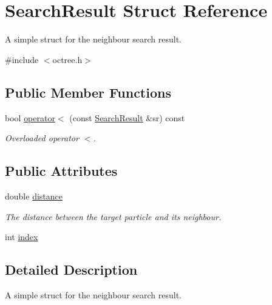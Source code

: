 \hypertarget{structSearchResult}{\section{Search\-Result Struct Reference}
\label{structSearchResult}
}


A simple struct for the neighbour search result.  




{\ttfamily \#include $<$octree.\-h$>$}

\subsection*{Public Member Functions}
\begin{DoxyCompactItemize}
\item 
\hypertarget{structSearchResult_a1ec14c4b56c210f654c4043b89d18121}{bool \hyperlink{structSearchResult_a1ec14c4b56c210f654c4043b89d18121}{operator$<$} (const \hyperlink{structSearchResult}{Search\-Result} \&sr) const }\label{structSearchResult_a1ec14c4b56c210f654c4043b89d18121}

\begin{DoxyCompactList}\small\item\em Overloaded operator $<$. \end{DoxyCompactList}\end{DoxyCompactItemize}
\subsection*{Public Attributes}
\begin{DoxyCompactItemize}
\item 
\hypertarget{structSearchResult_a4457e5b323ad7e1090c1868d39ac0e2c}{double \hyperlink{structSearchResult_a4457e5b323ad7e1090c1868d39ac0e2c}{distance}}\label{structSearchResult_a4457e5b323ad7e1090c1868d39ac0e2c}

\begin{DoxyCompactList}\small\item\em The distance between the target particle and its neighbour. \end{DoxyCompactList}\item 
int \hyperlink{structSearchResult_aa594b4339fa03e91d61d84c78e400b06}{index}
\end{DoxyCompactItemize}


\subsection{Detailed Description}
A simple struct for the neighbour search result. 


